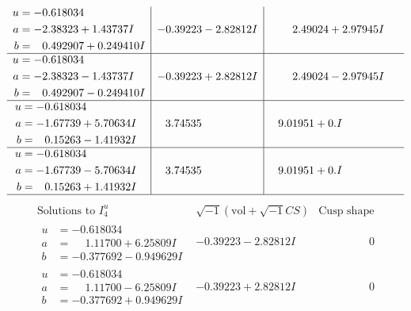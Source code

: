 \documentclass[1p]{elsarticle_modified}
\theoremstyle{definition}
\newcommand{\I}{\sqrt{-1}}
\begin{document}
$$\begin{array}{c|c|c}
\begin{aligned}
u &= -0.618034\phantom{ +0.000000I} \\
a &= -2.38323 + 1.43737 I \\
b &= \phantom{-}0.492907 + 0.249410 I\end{aligned}
 & -0.39223 - 2.82812 I & \phantom{-}2.49024 + 2.97945 I \\ \hline\begin{aligned}
u &= -0.618034\phantom{ +0.000000I} \\
a &= -2.38323 - 1.43737 I \\
b &= \phantom{-}0.492907 - 0.249410 I\end{aligned}
 & -0.39223 + 2.82812 I & \phantom{-}2.49024 - 2.97945 I \\ \hline\begin{aligned}
u &= -0.618034\phantom{ +0.000000I} \\
a &= -1.67739 + 5.70634 I \\
b &= \phantom{-}0.15263 - 1.41932 I\end{aligned}
 & \phantom{-}3.74535\phantom{ +0.000000I} & \phantom{-}9.01951 + 0. I\phantom{ +0.000000I} \\ \hline\begin{aligned}
u &= -0.618034\phantom{ +0.000000I} \\
a &= -1.67739 - 5.70634 I \\
b &= \phantom{-}0.15263 + 1.41932 I\end{aligned}
 & \phantom{-}3.74535\phantom{ +0.000000I} & \phantom{-}9.01951 + 0. I\phantom{ +0.000000I}\\
 \hline 
 \end{array}$$\newpage$$\begin{array}{c|c|c}  
\text{Solutions to }I^u_{4}& \I (\text{vol} + \sqrt{-1}CS) & \text{Cusp shape}\\
 \hline 
\begin{aligned}
u &= -0.618034\phantom{ +0.000000I} \\
a &= \phantom{-}1.11700 + 6.25809 I \\
b &= -0.377692 - 0.949629 I\end{aligned}
 & -0.39223 - 2.82812 I & \phantom{-0.000000 } 0 \\ \hline\begin{aligned}
u &= -0.618034\phantom{ +0.000000I} \\
a &= \phantom{-}1.11700 - 6.25809 I \\
b &= -0.377692 + 0.949629 I\end{aligned}
 & -0.39223 + 2.82812 I & \phantom{-0.000000 } 0 \\ \hline\begin{aligned}

\end{aligned}
\end{array}$$
\end{document}
